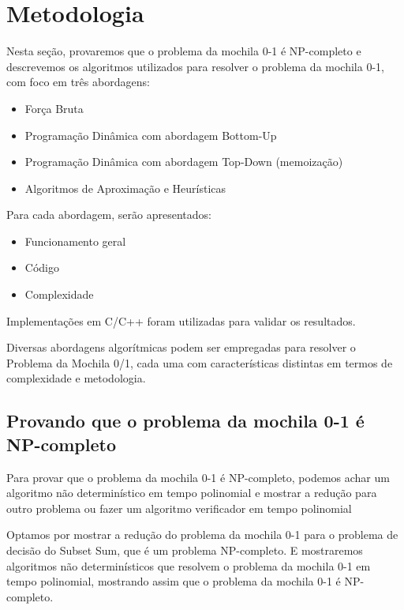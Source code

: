 \section{Metodologia}

Nesta seção, provaremos que o problema da mochila 0-1 é NP-completo e descrevemos os algoritmos utilizados para resolver o problema da mochila 0-1,
com foco em três abordagens:

\begin{itemize}
  \item Força Bruta
  \item Programação Dinâmica com abordagem Bottom-Up
  \item Programação Dinâmica com abordagem Top-Down (memoização)
  \item Algoritmos de Aproximação e Heurísticas
\end{itemize}
Para cada abordagem, serão apresentados: 

\begin{itemize}
  \item Funcionamento geral
  \item Código
  \item Complexidade

\end{itemize} 
Implementações em C/C++ foram utilizadas para validar os resultados.

Diversas abordagens algorítmicas podem ser empregadas para resolver o Problema da Mochila 0/1, cada uma com características distintas em termos de complexidade e metodologia.


\subsection{Provando que o problema da mochila 0-1 é NP-completo}

Para provar que o problema da mochila 0-1 é NP-completo, podemos achar um algoritmo não determinístico em tempo polinomial e mostrar a redução para outro problema ou fazer um algoritmo verificador em tempo polinomial

Optamos por mostrar a redução do problema da mochila 0-1 para o problema de decisão do Subset Sum, que é um problema NP-completo.
E mostraremos algoritmos não determinísticos que resolvem o problema da mochila 0-1 em tempo polinomial, mostrando assim que o problema da mochila 0-1 é NP-completo.

